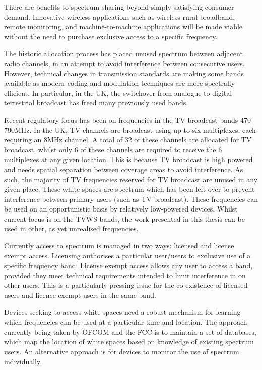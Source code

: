 There are benefits to spectrum sharing beyond simply satisfying consumer demand. Innovative wireless applications such as wireless rural broadband, remote monitoring, and machine-to-machine applications will be made viable without the need to purchase exclusive access to a specific frequency. 

The historic allocation process has placed unused spectrum between adjacent radio channels, in an attempt to avoid interference between consecutive users. However, technical changes in transmission standards are making some bands available as modern coding and modulation techniques are more spectrally efficient. In particular, in the UK, the switchover from analogue to digital terrestrial broadcast has freed many previously used bands.

Recent regulatory focus has been on frequencies in the TV broadcast bands 470-790MHz. In the UK, TV channels are broadcast using up to six multiplexes, each requiring an 8MHz channel. A total of 32 of these channels are allocated for TV broadcast, whilst only 6 of these channels are required to receive the 6 multiplexes at any given location. This is because TV broadcast is high powered and needs spatial separation between coverage areas to avoid interference. As such, the majority of TV frequencies reserved for TV broadcast are unused in any given place. These white spaces are spectrum which has been left over to prevent interference between primary users (such as TV broadcast). These frequencies can be used on an opportunistic basis by relatively low-powered devices. Whilst current focus is on the TVWS bands, the work presented in this thesis can be used in other, as yet unrealised frequencies.

Currently access to spectrum is managed in two ways: licensed and license exempt access. Licensing authorises a particular user/users to exclusive use of a specific frequency band. License exempt access allows any user to access a band, provided they meet technical requirements intended to limit interference in on other users. This is a particularly pressing issue for the co-existence of licensed users and licence exempt users in the same band.

Devices seeking to access white spaces need a robust mechanism for learning which frequencies can be used at a particular time and location. The approach currently being taken by OFCOM and the FCC is to maintain a set of databases, which map the location of white spaces based on knowledge of existing spectrum users. An alternative approach is for devices to monitor the use of spectrum individually.

